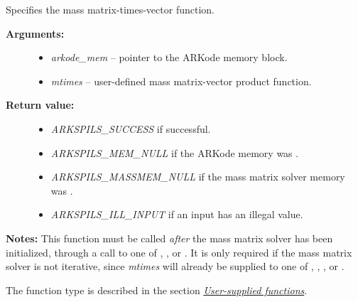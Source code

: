 \documentclass[letterpaper,10pt,english]{sphinxmanual}
\begin{document}
\begin{fulllineitems}
\label{c_interface/User_callable:ARKSpilsSetMassTimesVecFn}
Specifies the mass matrix-times-vector function.
\begin{description}
\item[{\textbf{Arguments:}}] \leavevmode\begin{itemize}
\item {} 
\emph{arkode\_mem} -- pointer to the ARKode memory block.

\item {} 
\emph{mtimes} -- user-defined mass matrix-vector product function.

\end{itemize}

\item[{\textbf{Return value:}}] \leavevmode\begin{itemize}
\item {} 
\emph{ARKSPILS\_SUCCESS} if successful.

\item {} 
\emph{ARKSPILS\_MEM\_NULL} if the ARKode memory was .

\item {} 
\emph{ARKSPILS\_MASSMEM\_NULL} if the mass matrix solver memory was .

\item {} 
\emph{ARKSPILS\_ILL\_INPUT} if an input has an illegal value.

\end{itemize}

\end{description}

\textbf{Notes:} This function must be called \emph{after} the mass matrix
solver has been initialized, through a call to one of
{\hyperref[c_interface/User_callable:ARKMassDense]{}}, {\hyperref[c_interface/User_callable:ARKMassLapackDense]{}},
{\hyperref[c_interface/User_callable:ARKMassBand]{}} or {\hyperref[c_interface/User_callable:ARKMassLapackBand]{}}.  It is
only required if the mass matrix solver is not iterative, since
\emph{mtimes} will already be supplied to one of
{\hyperref[c_interface/User_callable:ARKMassSpgmr]{}}, {\hyperref[c_interface/User_callable:ARKMassSpbcg]{}},
{\hyperref[c_interface/User_callable:ARKMassSptfqmr]{}}, {\hyperref[c_interface/User_callable:ARKMassSpfgmr]{}} or
{\hyperref[c_interface/User_callable:ARKMassPcg]{}}.

The function type {\hyperref[c_interface/User_supplied:ARKSpilsMassTimesVecFn]{}} is described
in the section {\hyperref[c_interface/User_supplied:cinterface-usersupplied]{\emph{User-supplied functions}}}.

\end{fulllineitems}
\end{document}
